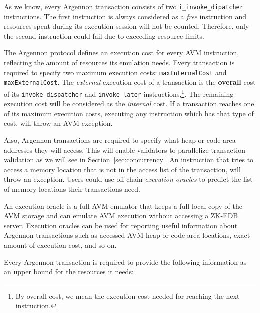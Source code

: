 As we know, every Argennon transaction consists of two \texttt{i\_invoke\_dipatcher} instructions. The first
instruction is always considered as a \emph{free} instruction and resources spent during its execution
session will not be counted. Therefore, only the second instruction could fail due to exceeding resource limits.

The Argennon protocol defines an execution cost for
every AVM instruction, reflecting the amount of resources its emulation needs. Every
transaction is required to specify two maximum execution costs: \texttt{maxInternalCost}
and \texttt{maxExternalCost}. The \emph{external} execution cost of a transaction is the \textbf{overall} cost of its
\texttt{invoke\_dispatcher} and \texttt{invoke\_later} instructions,\footnote{By overall cost, we mean the execution
cost needed for reaching the next instruction.}. The remaining execution cost will be considered as
the \emph{internal} cost. If a transaction reaches one of its maximum execution costs, executing any instruction
which has that type of cost, will throw an AVM exception.


Also, Argennon transactions are required to specify what heap or code area addresses they will access. This will
enable validators to parallelize transaction validation as we will see in Section~\ref{sec:concurrency}. An instruction
that tries to access a memory location that is not in the access list of the transaction, will throw an exception.
Users could use off-chain \emph{execution oracles} to predict the list of memory locations their transactions need.

An execution oracle is a full AVM emulator that keeps a full local copy of the AVM storage and can emulate AVM
execution without accessing a ZK-EDB server. Execution oracles can be used for reporting useful information about
Argennon transactions such as accessed AVM heap or code area locations, exact amount of execution cost,
and so on.

Every Argennon transaction is required to provide the following information as an upper bound for the
resources it needs:

